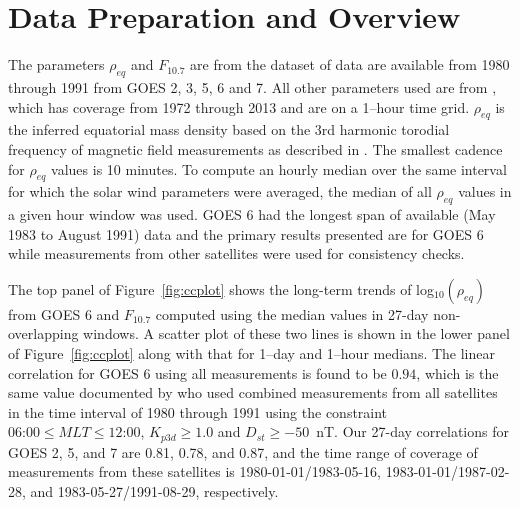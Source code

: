 \documentclass[draft,linenumbers]{agujournal}
\begin{document}


\section{Data Preparation and Overview}

The parameters $\rho_{eq}$ and $F_{10.7}$ are from the dataset of \citet{Takahashi2010} data are available from 1980 through 1991 from GOES 2, 3, 5, 6 and 7.  All other parameters used are from \citet{Kondrashov2014ReconstructionOfGaps}, which has coverage from 1972 through 2013 and are on a 1--hour time grid. $\rho_{eq}$ is the inferred equatorial mass density based on the 3rd harmonic torodial frequency of magnetic field measurements as described in \citet{Takahashi2010}.  The smallest cadence for $\rho_{eq}$ values is 10 minutes.  To compute an hourly median over the same interval for which the solar wind parameters were averaged, the median of all $\rho_{eq}$ values in a given hour window was used. GOES 6 had the longest span of available (May 1983 to August 1991) data and the primary results presented are for GOES 6 while measurements from other satellites were used for consistency checks.


The top panel of Figure~\ref{fig:ccplot} shows the long-term trends of log$_{10}(\rho_{eq})$ from GOES 6 and $F_{10.7}$ computed using the median values in 27-day non-overlapping windows.  A scatter plot of these two lines is shown in the lower panel of Figure~\ref{fig:ccplot} along with that for 1--day and 1--hour medians.  The linear correlation for GOES 6 using all measurements is found to be $0.94$, which is the same value documented by \citet{Takahashi2010} who used combined measurements from all satellites in the time interval of 1980 through 1991 using the constraint $06\mbox{:}00 \leq MLT \le 12\mbox{:}00$, $K_{p3d}\ge1.0$ and $D_{st}\ge -50$~nT.  Our 27-day correlations for GOES 2, 5, and 7 are 0.81, 0.78, and 0.87, and the time range of coverage of measurements from these satellites is 1980-01-01/1983-05-16, 1983-01-01/1987-02-28, and 1983-05-27/1991-08-29, respectively.
\end{document}
